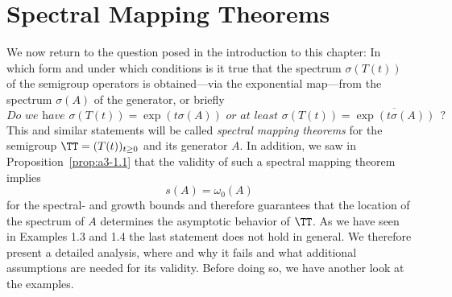 \section{Spectral Mapping Theorems}\label{sec:a3-6}
We now return to the question posed in the introduction to this chapter: In which form and under which conditions is it true that the spectrum $\sigma(T(t))$ of the semigroup operators is obtained---via the exponential map---from the spectrum $\sigma(A)$ of the generator, or briefly
\[
\textit{Do we have } \sigma(T(t)) = \exp(t\sigma(A)) \textit{ or at least }
 \sigma(T(t)) = \overline{\exp(t\sigma(A))} ~~?
\]
This and similar statements will be called \emph{spectral mapping theorems} for the semigroup $\TT = (T(t))_{t \geq 0}$ and its generator $A$.
In addition, we saw in Proposition~\ref{prop:a3-1.1} that the validity of such a spectral mapping theorem implies
\[
s(A) = \omega_{0}(A)
\]
for the spectral- and growth bounds and therefore guarantees that the location of the spectrum of $A$ determines the asymptotic behavior of $\TT$.
As we have seen in Examples 1.3 and 1.4 the last statement does not hold in general.
We therefore present a detailed analysis, where and why it fails and what additional assumptions are needed for its validity.
Before doing so, we have another look at the examples.
